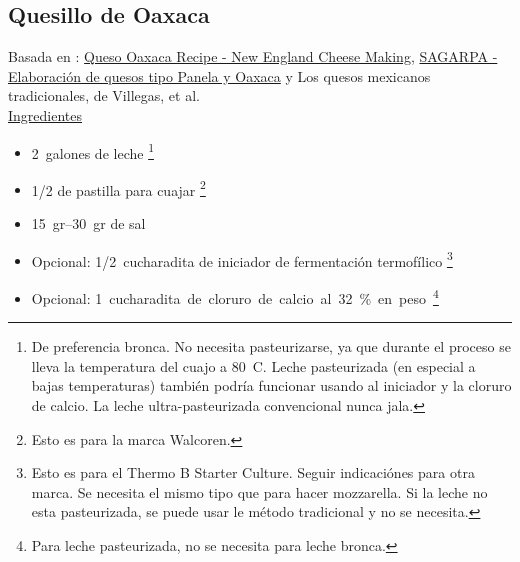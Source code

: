 \subsection{Quesillo de Oaxaca}

Basada en : \href{https://cheesemaking.com/products/queso-oaxaca-recipe}{Queso Oaxaca Recipe - New England Cheese Making}, \href{http://www.sagarpa.gob.mx/desarrolloRural/Documents/fichasaapt/Elaboraci%C3%B3n%20de%20quesos.pdf}{SAGARPA - Elaboración de quesos tipo Panela y Oaxaca} y Los quesos mexicanos tradicionales, de Villegas, et al. \\

\underline{Ingredientes}
\begin{itemize}
\item \SI{2}{galones} de leche \footnote{De preferencia bronca. No necesita pasteurizarse, ya que durante el proceso se lleva la temperatura del cuajo a \SI{80}{C}. Leche pasteurizada (en especial a bajas temperaturas) también podría funcionar usando al iniciador y la cloruro de calcio. La leche ultra-pasteurizada convencional nunca jala.}
\item \num{1/2} de pastilla para cuajar \footnote{Esto es para la marca Walcoren.} 
\item \SIrange{15}{30}{gr} de sal
\item Opcional: \SI{1/2}{cucharadita} de iniciador de fermentación termofílico \footnote{Esto es para el Thermo B Starter Culture. Seguir indicaciónes para otra marca. Se necesita el mismo tipo que para hacer mozzarella. Si la leche no esta pasteurizada, se puede usar le método tradicional y no se necesita.}
\item Opcional: \SI{1} cucharadita de cloruro de calcio al 32\% en peso \footnote{Para leche pasteurizada, no se necesita para leche bronca.}
\end{itemize}


